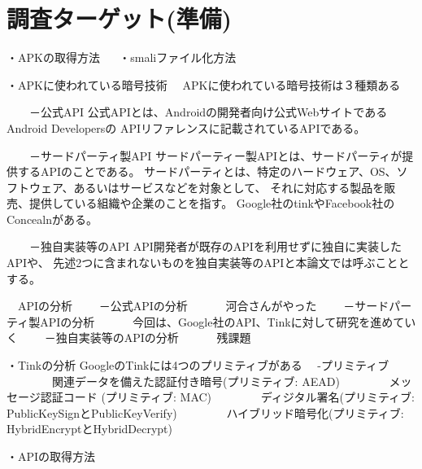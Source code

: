 \newpage
\section{調査ターゲット(準備)}

・APKの取得方法
　
・smaliファイル化方法

・APKに使われている暗号技術
　APKに使われている暗号技術は３種類ある

　　－公式API
公式APIとは、Androidの開発者向け公式WebサイトであるAndroid Developersの
APIリファレンスに記載されているAPIである。

　　－サードパーティ製API
サードパーティー製APIとは、サードパーティが提供するAPIのことである。
サードパーティとは、特定のハードウェア、OS、ソフトウェア、あるいはサービスなどを対象として、
それに対応する製品を販売、提供している組織や企業のことを指す。
Google社のtinkやFacebook社のConcealnがある。

　　－独自実装等のAPI
API開発者が既存のAPIを利用せずに独自に実装したAPIや、
先述2つに含まれないものを独自実装等のAPIと本論文では呼ぶこととする。

　APIの分析
　　－公式APIの分析
　　　河合さんがやった
　　－サードパーティ製APIの分析
　　　今回は、Google社のAPI、Tinkに対して研究を進めていく
　　－独自実装等のAPIの分析
　　　残課題

・Tinkの分析
GoogleのTinkには4つのプリミティブがある
　-プリミティブ
　　　　関連データを備えた認証付き暗号(プリミティブ: AEAD)
　　　　メッセージ認証コード (プリミティブ: MAC)
　　　　ディジタル署名(プリミティブ: PublicKeySignとPublicKeyVerify)
　　　　ハイブリッド暗号化(プリミティブ: HybridEncryptとHybridDecrypt)

・APIの取得方法
